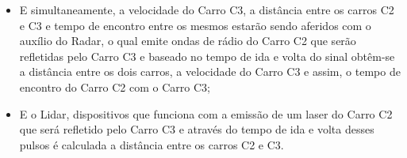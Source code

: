 \begin{enumerate}
\begin{itemize}
\begin{itemize}
      \item E simultaneamente, a velocidade do Carro C3, a distância entre os
      carros C2 e C3 e tempo de encontro entre os mesmos estarão sendo aferidos
      com o auxílio do Radar, o qual emite ondas de rádio do Carro C2 que serão
      refletidas pelo Carro C3 e baseado no tempo de ida e volta do sinal
      obtêm-se a distância entre os dois carros, a velocidade do Carro C3 e
      assim, o tempo de encontro do Carro C2 com o Carro C3;

      \item E o Lidar, dispositivos que funciona com a emissão de um laser do
      Carro C2 que será refletido pelo Carro C3 e através do tempo de ida e
      volta desses pulsos é calculada a distância entre os carros C2 e C3.

    \end{itemize}
  \end{itemize}
\end{enumerate}
